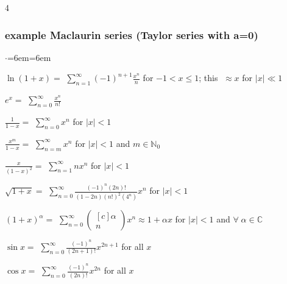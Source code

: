 \documentclass[letterpaper,landscape,10pt]{article}
\newenvironment{litemize}
{\begin{list}{$\cdot$}{\leftmargin=6em\labelwidth=6em}
	\setlength{\itemsep}{0pt}
	\setlength{\parskip}{0pt}
	\setlength{\parsep}{0pt}}
{\end{list}}
\begin{document}
{\begin{multicols}{4}
		\subsubsection*{example Maclaurin series (Taylor series with a=0)}
		\begin{litemize}
		  \item[$\ln (1+x) = $] $ \sum_{n=1}^\infty \left( -1 \right)^{n+1} \frac{x^n}{n}$ for $-1 < x \le 1$; this $\;\approx x$ for $|x| \ll 1$  \\
			\vspace{2.5pt}
		  \item[$e^x = $] $ \sum_{n=0}^\infty \frac{x^n}{n!}$  \\
			\vspace{2.5pt}
		  \item[$\frac{1}{1-x} = $] $ \sum_{n=0}^\infty x^n$ for $|x| < 1$  \\
			\vspace{2.5pt}
		  \item[$\frac{x^m}{1-x} = $] $ \sum_{n=m}^\infty x^n$ for $|x| < 1$ and $m \in \mathbb{N}_0$  \\
			\vspace{2.5pt}
		  \item[$\frac{x}{(1-x)^2} = $] $ \sum_{n=1}^\infty nx^n$ for $|x| < 1$  \\
			\vspace{2.5pt}
		  \item[$\sqrt{1+x} = $] $ \sum_{n=0}^\infty \frac{(-1)^n(2n)!}{(1-2n)(n!)^2(4^n)}x^n$ for $|x| < 1$  \\
			\vspace{2.5pt}
		  \item[$(1+x)^\alpha = $] $ \sum_{n=0}^\infty \begin{pmatrix}[c]\alpha \\ n \end{pmatrix}x^n \approx 1+\alpha x$ for $|x| < 1$ and $\forall \; \alpha \in \mathbb{C}$  \\
			\vspace{2.5pt}
		  \item[$\sin x = $] $ \sum_{n=0}^\infty \frac{(-1)^n}{(2n+1)!}x^{2n+1}$ for all $x$  \\
			\vspace{2.5pt}
		  \item[$\cos x = $] $ \sum_{n=0}^\infty \frac{(-1)^n}{(2n)!}x^{2n}$ for all $x$  \\
		\end{litemize}


\end{multicols}}
\end{document}
